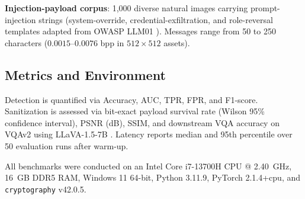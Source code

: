 \documentclass[conference]{IEEEtran}
\begin{document}
\textbf{Injection-payload corpus}: 1,000 diverse natural images carrying prompt-injection strings (system-override, credential-exfiltration, and role-reversal templates adapted from OWASP LLM01 \cite{owasp2023top10}). Messages range from 50 to 250 characters ($0.0015\text{--}0.0076$ bpp in $512 \times 512$ assets).

\subsection{Metrics and Environment}
Detection is quantified via Accuracy, AUC, TPR, FPR, and F1-score. Sanitization is assessed via bit-exact payload survival rate (Wilson 95\% confidence interval), PSNR (dB), SSIM, and downstream VQA accuracy on VQAv2 using LLaVA-1.5-7B \cite{liu2023visual}. Latency reports median and 95th percentile over 50 evaluation runs after warm-up.

All benchmarks were conducted on an Intel Core i7-13700H CPU @ 2.40~GHz, 16~GB DDR5 RAM, Windows 11 64-bit, Python 3.11.9, PyTorch 2.1.4+cpu, and \texttt{cryptography} v42.0.5.

\begin{table}[t]
\caption{Gate 2 Detection Performance (Test Split)}
\label{tab:detection_perf}
\centering
\vspace{-1.5mm}
\vspace{1.5mm}
\end{table}
\end{document}
